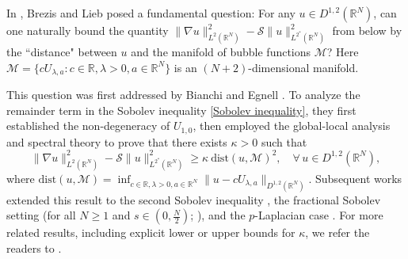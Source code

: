 \documentclass[11pt]{article}
\begin{document}
In \cite{BL85}, Brezis and Lieb posed a fundamental question: For any \( u \in D^{1,2}(\mathbb{R}^{N}) \), can one naturally bound the quantity \( \|\nabla u\|_{L^{2}(\mathbb{R}^{N})}^{2} - \mathcal{S}\|u\|_{L^{2^{\ast}}(\mathbb{R}^{N})}^{2} \) from below by the ``distance" between \( u \) and the manifold of bubble functions \( \mathcal{M} \)? Here $\mathcal{M}=\big\{cU_{\lambda,a}: c\in \mathbb{R},\lambda>0,a\in \mathbb{R}^N\big\}$ is an $(N+2)$-dimensional manifold.

This question
was first addressed by Bianchi and Egnell \cite{BE91}. To analyze the remainder term  in the Sobolev inequality \eqref{Sobolev inequality}, they first established the non-degeneracy of
 $U_{1,0}$, then employed the global-local analysis and spectral theory to prove that
 there exists  $\kappa>0$ such that
\begin{equation*}
  \|\nabla u\|_{L^{2}(\mathbb{R}^{N})}^{2}-\mathcal{S}\|u\|_{L^{2^{\ast}}(\mathbb{R}^{N})}^{2}\geq \kappa ~  \mathrm{dist}(u,\mathcal{M})^2,
  \quad \forall \, u\in{D}^{1,2}(\mathbb{R}^{N}),
\end{equation*}
where  $\mathrm{dist}(u,\mathcal{M})=\inf_{c\in \mathbb{R},\lambda>0,a\in \mathbb{R}^N}\|u-cU_{\lambda,a}\|_{D^{1,2}(\mathbb{R}^{N})}$.
Subsequent works extended this result to the second Sobolev inequality \cite{LW2000},
the fractional Sobolev setting (for all \( N \geq 1 \) and \( s \in (0,\frac{N}{2}) \); \cite{CFW13}), and the \( p \)-Laplacian case \cite{FN19,FZ22,N20}.
For more related results, including explicit lower or upper bounds for \( \kappa \), we refer the readers to \cite{DEFF25,K23,K24,K25,CLT25,CLT24,CLT24'}.

\end{document}
